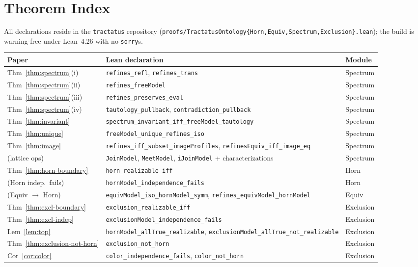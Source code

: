 \documentclass[10pt, letterpaper]{article}
\theoremstyle{remark}
\newcommand{\lean}[1]{\texttt{#1}}
\begin{document}
\appendix

\section{Theorem Index}\label{app:index}

All declarations reside in the \lean{tractatus} repository
(\lean{proofs/TractatusOntology\{Horn,Equiv,Spectrum,Exclusion\}.lean});
the build is warning-free under Lean~4.26 with no \lean{sorry}s.

\begin{center}
\small
\begin{tabular}{@{}lll@{}}
\toprule
Paper & Lean declaration & Module \\
\midrule
Thm~\ref{thm:spectrum}(i) & \lean{refines\_refl}, \lean{refines\_trans} & Spectrum \\
Thm~\ref{thm:spectrum}(ii) & \lean{refines\_freeModel} & Spectrum \\
Thm~\ref{thm:spectrum}(iii) & \lean{refines\_preserves\_eval} & Spectrum \\
Thm~\ref{thm:spectrum}(iv) & \lean{tautology\_pullback}, \lean{contradiction\_pullback} & Spectrum \\
Thm~\ref{thm:invariant} & \lean{spectrum\_invariant\_iff\_freeModel\_tautology} & Spectrum \\
Thm~\ref{thm:unique} & \lean{freeModel\_unique\_refines\_iso} & Spectrum \\
Thm~\ref{thm:image} & \lean{refines\_iff\_subset\_imageProfiles}, \lean{refinesEquiv\_iff\_image\_eq} & Spectrum \\
(lattice ops) & \lean{JoinModel}, \lean{MeetModel}, \lean{iJoinModel} + characterizations & Spectrum \\
Thm~\ref{thm:horn-boundary} & \lean{horn\_realizable\_iff} & Horn \\
(Horn indep.\ fails) & \lean{hornModel\_independence\_fails} & Horn \\
(Equiv $\to$ Horn) & \lean{equivModel\_iso\_hornModel\_symm}, \lean{refines\_equivModel\_hornModel} & Equiv \\
Thm~\ref{thm:excl-boundary} & \lean{exclusion\_realizable\_iff} & Exclusion \\
Thm~\ref{thm:excl-indep} & \lean{exclusionModel\_independence\_fails} & Exclusion \\
Lem~\ref{lem:top} & \lean{hornModel\_allTrue\_realizable}, \lean{exclusionModel\_allTrue\_not\_realizable} & Exclusion \\
Thm~\ref{thm:exclusion-not-horn} & \lean{exclusion\_not\_horn} & Exclusion \\
Cor~\ref{cor:color} & \lean{color\_independence\_fails}, \lean{color\_not\_horn} & Exclusion \\
\bottomrule
\end{tabular}
\end{center}



\end{document}

